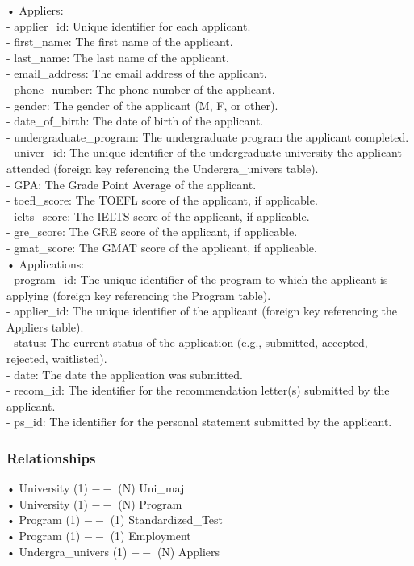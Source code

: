 \documentclass[12pt, a4paper]{article}
\begin{document}
\begin{spacing}{1.32}
\noindent
• Appliers:\\
- applier\_id: Unique identifier for each applicant.\\
- first\_name: The first name of the applicant.\\
- last\_name: The last name of the applicant.\\
- email\_address: The email address of the applicant.\\
- phone\_number: The phone number of the applicant.\\
- gender: The gender of the applicant (M, F, or other).\\
- date\_of\_birth: The date of birth of the applicant.\\
- undergraduate\_program: The undergraduate program the applicant completed.\\
- univer\_id: The unique identifier of the undergraduate university the applicant attended (foreign key referencing the Undergra\_univers table).\\
- GPA: The Grade Point Average of the applicant.\\
- toefl\_score: The TOEFL score of the applicant, if applicable.\\
- ielts\_score: The IELTS score of the applicant, if applicable.\\
- gre\_score: The GRE score of the applicant, if applicable.\\
- gmat\_score: The GMAT score of the applicant, if applicable.\\

\noindent
• Applications:\\
- program\_id: The unique identifier of the program to which the applicant is applying (foreign key referencing the Program table).\\
- applier\_id: The unique identifier of the applicant (foreign key referencing the Appliers table).\\
- status: The current status of the application (e.g., submitted, accepted, rejected, waitlisted).\\
- date: The date the application was submitted.\\
- recom\_id: The identifier for the recommendation letter(s) submitted by the applicant.\\
- ps\_id: The identifier for the personal statement submitted by the applicant.\\

\subsubsection{Relationships} 
\noindent
•	University (1) $--$ (N) Uni\_maj \\
•	University (1) $--$ (N) Program \\
•	Program (1) $--$ (1) Standardized\_Test \\
•	Program (1) $--$ (1) Employment \\
•	Undergra\_univers (1) $--$ (N) Appliers \\


\end{spacing}
\end{document}
